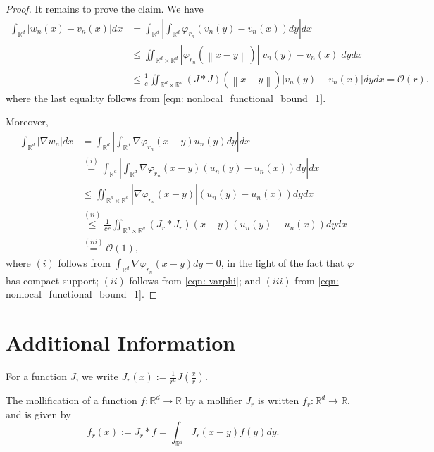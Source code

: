 \documentclass{article}
\newcommand{\Reals}{\mathbb{R}}
\newcommand{\norm}[1]{\left\lVert#1\right\rVert}
\newcommand{\abs}[1]{\left \lvert #1 \right \rvert}
\newcommand{\1}{\mathbf{1}}
\theoremstyle{alden}
\theoremstyle{aldenthm}
\theoremstyle{remark}
\begin{document}
\begin{proof}
	It remains to prove the claim. We have
	\begin{align*}
	\int_{\Reals^d} \abs{w_n(x) - v_n(x)} dx & = \int_{\Reals^d} \abs{ \int_{\Reals^d} \varphi_{r_n}(v_n(y) - v_n(x)) dy} dx \\
	& \leq \iint_{\Reals^d \times \Reals^d} \abs{\varphi_{r_n}(\norm{x - y})} \abs{v_n(y) - v_n(x)} dy dx \\
	& \leq \frac{1}{c} \iint_{\Reals^d \times \Reals^d} (J \ast J)(\norm{x - y}) \abs{v_n(y) - v_n(x)} dy dx = \mathcal{O}(r).
	\end{align*}
	where the last equality follows from \eqref{eqn: nonlocal_functional_bound_1}. 
	
	Moreover, 
	\begin{align*}
	\int_{\Reals^d} \abs{\nabla w_n} dx & = \int_{\Reals^d} \abs{\int_{\Reals^d} \nabla \varphi_{r_n}(x - y) u_n(y) dy} dx \\
	& \overset{(i)}{=} \int_{\Reals^d} \abs{\int_{\Reals^d} \nabla \varphi_{r_n}(x - y) (u_n(y) - u_n(x)) dy} dx \\
	& \leq \iint_{\Reals^d \times \Reals^d} \abs{\nabla \varphi_{r_n}(x - y)} (u_n(y) - u_n(x)) dy dx \\
	& \overset{(ii)}{\leq} \frac{1}{cr}  \iint_{\Reals^d \times \Reals^d} (J_r \ast J_r)(x-y) (u_n(y) - u_n(x)) dy dx \\
	& \overset{(iii)}{=} \mathcal{O}(1),
	\end{align*}
	where $(i)$ follows from $\int_{\Reals^d} \nabla \varphi_{r_n}(x - y) dy = 0$, in the light of the fact that $\varphi$ has compact support; $(ii)$ follows from \eqref{eqn: varphi}; and $(iii)$ from \eqref{eqn: nonlocal_functional_bound_1}.
\end{proof}

\section{Additional Information}

For a function $J$, we write $J_r(x) := \frac{1}{r^d} J\left(\frac{x}{r}\right)$. 

The mollification of a function $f:\Reals^d \to \Reals$ by a mollifier $J_{r}$ is written $f_r: \Reals^d \to \Reals$, and is given by
\begin{equation*}
f_r(x) := J_r \ast f = \int_{\Reals^d} J_r(x - y) f(y) dy.
\end{equation*}
\end{document}
